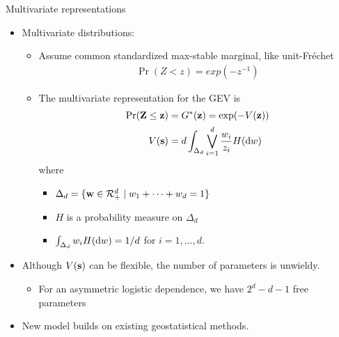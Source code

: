 \documentclass{beamer}
\begin{document}
\begin{frame}{Multivariate representations}
  \begin{itemize}
    \item Multivariate distributions:
    \begin{itemize}
      \item Assume common standardized max-stable marginal, like unit-Fr\'{e}chet
      \begin{align*}
        \Pr(Z < z) = exp(-z^{-1})
      \end{align*}
      \item The multivariate representation for the GEV is
      \begin{align*}
        \Pr(\mbox{\bf Z} \le \mbox{\bf z})  &= G^*(\mbox{\bf z}) = \exp(-V(\mbox{\bf z}))\\
                V(\mbox{\bf s})    &= d \int_{\Delta_d} \bigvee_{i = 1}^d \frac{w_i}{z_i} H(\text{d} w)
      \end{align*}
      where
      \begin{itemize}
        \item $\Delta_d = \{ \mbox{\bf w} \in {\cal R}^d_+ \mid w_1 + \cdots + w_d = 1\}$
        \item $H$ is a probability measure on $\Delta_d$
        \item $\int_{\Delta_d}w_i H(\text{d} w) = 1 / d$ for $i = 1, \ldots, d$.
      \end{itemize}
    \end{itemize}
  \end{itemize}
\end{frame}

\begin{frame}{}
  \begin{itemize} \setlength{\itemsep}{0.5em}
    \item Although $V(\mbox{\bf s})$ can be flexible, the number of parameters is unwieldy.
    \begin{itemize}
      \item For an asymmetric logistic dependence, we have $2^d - d - 1$ free parameters
    \end{itemize}
    \item New model builds on existing geostatistical methods.
  \end{itemize}
\end{frame}
\end{document}
